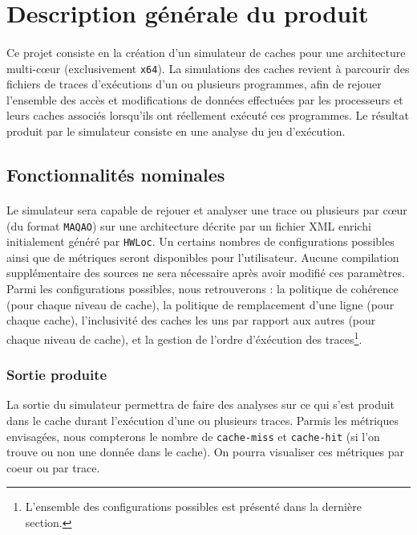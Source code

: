 \section{Description générale du produit}

\paragraph{}
Ce projet consiste en la création d'un simulateur de caches pour une architecture multi-c\oe ur (exclusivement \verb!x64!). La simulations des caches revient à parcourir des fichiers de traces d'exécutions d'un ou plusieurs programmes, afin de rejouer l'ensemble des accès et modifications de données effectuées par les processeurs et leurs caches associés lorsqu'ils ont réellement exécuté ces programmes. Le résultat produit par le simulateur consiste en une analyse du jeu d'exécution.

\subsection{Fonctionnalités nominales}

\paragraph{}
Le simulateur sera capable de rejouer et analyser une trace ou plusieurs par c\oe ur (du format \texttt{MAQAO}) sur une architecture décrite par un fichier XML enrichi initialement généré par \texttt{HWLoc}. Un certains nombres de configurations possibles ainsi que de métriques seront disponibles pour l'utilisateur. Aucune compilation supplémentaire des sources ne sera nécessaire après avoir modifié ces paramètres. Parmi les configurations possibles, nous retrouverons : la politique de cohérence (pour chaque niveau de cache), la politique de remplacement d'une ligne (pour chaque cache), l'inclusivité des caches les uns par rapport aux autres (pour chaque niveau de cache), et la gestion de l'ordre d'éxécution des traces\footnote{L'ensemble des configurations possibles est présenté dans la dernière section.}.

\subsubsection{Sortie produite}
La sortie du simulateur permettra de faire des analyses sur ce qui s'est produit dans le cache durant l'exécution d'une ou plusieurs traces. Parmis les métriques envisagées, nous compterons le nombre de \texttt{cache-miss} et \texttt{cache-hit} (si l'on trouve ou non une donnée dans le cache). On pourra visualiser ces métriques par coeur ou par trace.

